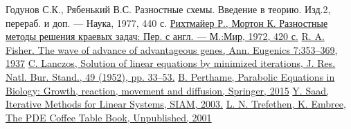 \renewcommand{\refname}{Список використаних джерел}
\begin{thebibliography}{8}
Годунов С.К., Рябенький В.С. Разностные схемы. Введение в теорию. Изд.2, перераб. и доп. — Наука, 1977, 440 с.
\href{https://issuu.com/fwebsite/docs/rixtmajer_morton_raznostnie_metody_}{Рихтмайер Р., Мортон К. Разностные методы решения краевых задач: Пер. с англ. — М.:Мир, 1972, 420 с.}
\href{https://digital.library.adelaide.edu.au/dspace/bitstream/2440/15125/1/152.pdf}{R. A. Fisher. The wave of advance of advantageous genes, Ann. Eugenics 7:353–369, 1937}
\href{https://archive.org/details/jresv49n1p33}{C. Lanczos, Solution of linear equations by minimized iterations, J. Res. Natl. Bur. Stand., 49 (1952), pp. 33–53.}
\href{https://books.google.com.ua/books?id=0pOKCgAAQBAJ&printsec=frontcover&hl=uk#v=onepage&q&f=false}{B. Perthame, Parabolic Equations in Biology: Growth, reaction, movement and diffusion, Springer, 2015}
\href{http://www-users.cs.umn.edu/~saad/IterMethBook_2ndEd.pdf}{Y. Saad, Iterative Methods for Linear Systems, SIAM, 2003.}
\href{http://people.maths.ox.ac.uk/trefethen/pdectb/fisher2.pdf}{L. N. Trefethen, K. Embree, The PDE Coffee Table Book, Unpublished, 2001}
\end{thebibliography}